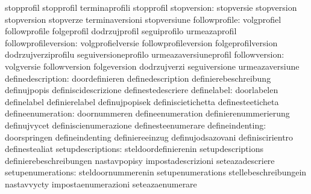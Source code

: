                                   stopprofil                       stopprofil
                                  terminaprofili                   stopprofil
                     stopversion: stopversie                       stopversion
                                  stopversion                      stopverze
                                  terminaversioni                  stopversiune
                   followprofile: volgprofiel                      followprofile
                                  folgeprofil                      dodrzujprofil
                                  seguiprofilo                     urmeazaprofil
            followprofileversion: volgprofielversie                followprofileversion
                                  folgeprofilversion               dodrzujverziprofilu
                                  seguiversioneprofilo             urmeazaversiuneprofil
                   followversion: volgversie                       followversion
                                  folgeversion                     dodrzujverzi
                                  seguiversione                    urmeazaversiune
               definedescription: doordefinieren                   definedescription
                                  definierebeschreibung            definujpopis
                                  definiscidescrizione             definestedescriere
                     definelabel: doorlabelen                      definelabel
                                  definierelabel                   definujpopisek
                                  definiscietichetta               definesteeticheta
               defineenumeration: doornummeren                     defineenumeration
                                  definierenummerierung            definujvycet
                                  definiscienumerazione            definesteenumerare
                 defineindenting: doorspringen                     defineindenting
                                  definiereeinzug                  definujodsazovani
                                  definiscirientro                 definestealiat
               setupdescriptions: steldoordefinierenin             setupdescriptions
                                  definierebeschreibungen          nastavpopisy
                                  impostadescrizioni               seteazadescriere
               setupenumerations: steldoornummerenin               setupenumerations
                                  stellebeschreibungein            nastavvycty
                                  impostaenumerazioni              seteazaenumerare
